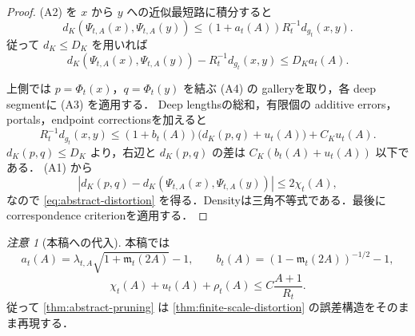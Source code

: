 \documentclass[a4paper,11pt]{ltjsarticle}
\numberwithin{equation}{section}
\theoremstyle{plain}
\theoremstyle{definition}
\theoremstyle{remark}
\newtheorem{remark}[remark]{注意}
\begin{document}
\begin{proof}
(A2) を $x$ から $y$ への近似最短路に積分すると
\[
 d_K(\Psi_{t,A}(x),\Psi_{t,A}(y))
 \le(1+a_t(A))R_t^{-1}d_{g_t}(x,y).
\]
従って $d_K\le D_K$ を用いれば
\[
 d_K(\Psi_{t,A}(x),\Psi_{t,A}(y))-R_t^{-1}d_{g_t}(x,y)
 \le D_Ka_t(A).
\]

上側では $p=\Phi_t(x)$，$q=\Phi_t(y)$ を結ぶ (A4) の galleryを取り，各 deep segmentに (A3) を適用する．
Deep lengthsの総和，有限個の additive errors，portals，endpoint correctionsを加えると
\[
 R_t^{-1}d_{g_t}(x,y)
 \le(1+b_t(A))\bigl(d_K(p,q)+u_t(A)\bigr)+C_Ku_t(A).
\]
$d_K(p,q)\le D_K$ より，右辺と $d_K(p,q)$ の差は $C_K(b_t(A)+u_t(A))$ 以下である．
(A1) から
\[
 |d_K(p,q)-d_K(\Psi_{t,A}(x),\Psi_{t,A}(y))|\le2\chi_t(A),
\]
なので \eqref{eq:abstract-distortion} を得る．Densityは三角不等式である．最後に correspondence criterionを適用する．
\end{proof}

\begin{remark}[本稿への代入]
本稿では
\[
 a_t(A)=\lambda_{t,A}\sqrt{1+\mathfrak m_t(2A)}-1,
 \qquad
 b_t(A)=(1-\mathfrak m_t(2A))^{-1/2}-1,
\]
\[
 \chi_t(A)+u_t(A)+\rho_t(A)\le C\frac{A+1}{R_t}.
\]
従って \cref{thm:abstract-pruning} は \cref{thm:finite-scale-distortion} の誤差構造をそのまま再現する．
\end{remark}
\end{document}
